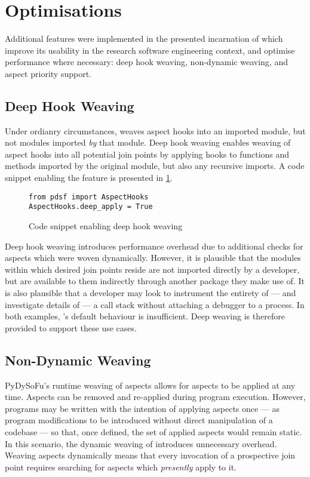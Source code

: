 \section{Optimisations}

Additional features were implemented in the presented incarnation of \pdsf which
improve its usability in the research software engineering context, and optimise
performance where necessary: deep hook weaving, non-dynamic weaving, and aspect
priority support.

\subsection{Deep Hook Weaving}\label{deep_hook_weaving}

Under ordianry circumstances, \pdsf weaves aspect hooks into an imported module,
but not modules imported \emph{by} that module. 
Deep hook weaving enables weaving of aspect hooks into all potential join points
by applying hooks to functions and methods imported by the original module, but
also any recursive imports. A code snippet enabling the feature is presented in
\cref{fig:enabling_deep_apply}.

\begin{figure}
    \begin{lstlisting}
from pdsf import AspectHooks
AspectHooks.deep_apply = True
    \end{lstlisting}
    \caption{Code snippet enabling deep hook weaving}
    \label{fig:enabling_deep_apply}
\end{figure}

Deep hook weaving introduces performance overhead due to additional checks for
aspects which were woven dynamically. However, it is plausible that the modules
within which desired join points reside are not imported directly by a
developer, but are available to them indirectly through another package they
make use of. It is also plausible that a developer may look to instrument the
entirety of --- and investigate details of --- a call stack without attaching a
debugger to a process. In both examples, \pdsf{}'s default behaviour is
insufficient. Deep weaving is therefore provided to support these use cases.

\subsection{Non-Dynamic Weaving}

PyDySoFu's runtime weaving of aspects allows for aspects to be applied at any
time. Aspects can be removed and re-applied during program execution. However,
programs may be written with the intention of applying aspects once --- as
program modifications to be introduced without direct manipulation of a codebase
--- so that, once defined, the set of applied aspects would remain static. In
this scenario, the dynamic weaving of \pdsf introduces unnecessary overhead.
Weaving aspects dynamically means that every invocation of a prospective join
point requires searching for aspects which \emph{presently} apply to it.

